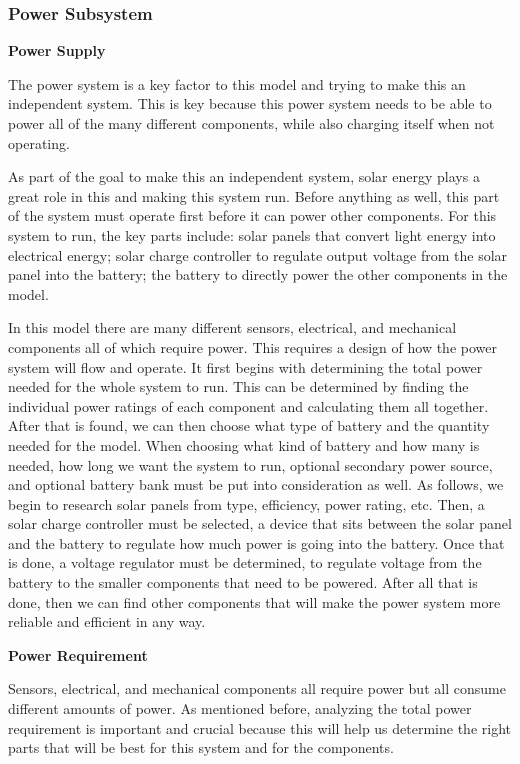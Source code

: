 \subsubsection{Power Subsystem}
\textbf{Power Supply}\par
The power system is a key factor to this model and trying to make this an independent system. This is key because this power system needs to be able to power all of the many different components, while also charging itself when not operating.\par
As part of the goal to make this an independent system, solar energy plays a great role in this and making this system run. Before anything as well, this part of the system must operate first before it can power other components. For this system to run, the key parts include: solar panels that convert light energy into electrical energy; solar charge controller to regulate output voltage from the solar panel into the battery; the battery to directly power the other components in the model.\par
In this model there are many different sensors, electrical, and mechanical components all of which require power. This requires a design of how the power system will flow and operate. It first begins with determining the total power needed for the whole system to run. This can be determined by finding the individual power ratings of each component and calculating them all together. After that is found, we can then choose what type of battery and the quantity needed for the model. When choosing what kind of battery and how many is needed, how long we want the system to run, optional secondary power source, and optional battery bank must be put into consideration as well. As follows, we begin to research solar panels from type, efficiency, power rating, etc. Then, a solar charge controller must be selected, a device that sits between the solar panel and the battery to regulate how much power is going into the battery. Once that is done, a voltage regulator must be determined, to regulate voltage from the battery to the smaller components that need to be powered. After all that is done, then we can find other components that will make the power system more reliable and efficient in any way.\par
\textbf{Power Requirement}\par
Sensors, electrical, and mechanical components all require power but all consume different amounts of power. As mentioned before, analyzing the total power requirement is important and crucial because this will help us determine the right parts that will be best for this system and for the components.  \par
